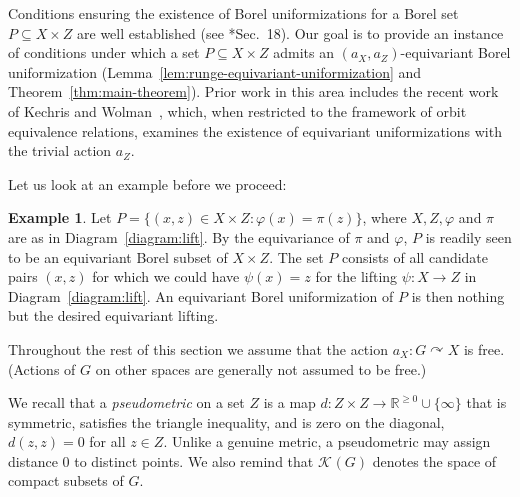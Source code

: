 \documentclass[12pt]{paper}
\numberwithin{equation}{section}
\theoremstyle{plain}
\theoremstyle{definition}
\newtheorem{exmpl}[theorem]{Example}
\newcommand{\R}{\mathbb{R}}
\newcommand{\vietoris}[2][]{\mathcal{K}_{#1}(#2)}
\newcommand{\acts}{\curvearrowright}
\renewcommand{\phi}{\varphi}
\begin{document}
Conditions ensuring the existence of Borel uniformizations for a Borel set
\(P \subseteq X \times Z\) are well established (see \cite{Kechris}*{Sec.~18}). Our goal is to
provide an instance of conditions under which a set \(P \subseteq X \times Z\) admits an
\((a_{X}, a_{Z})\)-equivariant Borel uniformization
(Lemma~\ref{lem:runge-equivariant-uniformization} and Theorem~\ref{thm:main-theorem}). Prior work in
this area includes the recent work of Kechris and Wolman~\cite{2405.15111}, which, when restricted
to the framework of orbit equivalence relations, examines the existence of equivariant
uniformizations with the trivial action \(a_{Z}\).

Let us look at an example before we proceed:

\begin{exmpl}
  Let \(P=\{(x,z)\in X\times Z:\phi(x)=\pi(z)\}\), where \(X,Z,\phi\) and \(\pi\) are as in
  Diagram~\ref{diagram:lift}.  By the equivariance of \(\pi\) and \(\phi\), \(P\) is readily seen to
  be an equivariant Borel subset of \(X\times Z\).  The set \(P\) consists of all candidate pairs
  \((x,z)\) for which we could have \(\psi(x)=z\) for the lifting \(\psi:X\to Z\) in
  Diagram~\ref{diagram:lift}. An equivariant Borel uniformization of \(P\) is then nothing but the
  desired equivariant lifting.
\end{exmpl}


Throughout the rest of this section we assume that the action \(a_{X} : G \acts X\) is
free. (Actions of \(G\) on other spaces are generally not assumed to be free.)

We recall that a \emph{pseudometric} on a set \(Z\) is a map
\(d : Z \times Z \to \R^{\ge0} \cup \{\infty\}\)
that is symmetric, satisfies the triangle
inequality, and is zero on the diagonal, \(d(z,z) = 0\) for all \(z \in Z\).  Unlike a genuine
metric, a pseudometric may assign distance \(0\) to distinct points.  We also remind that
\(\vietoris{G}\) denotes the space of compact subsets of \(G\).
\end{document}
